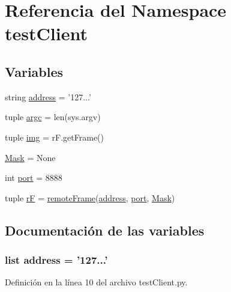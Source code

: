 \hypertarget{namespacetestClient}{\section{Referencia del Namespace test\+Client}
\label{namespacetestClient}
}
\subsection*{Variables}
\begin{DoxyCompactItemize}
\item 
string \hyperlink{namespacetestClient_aa723f31c9553b9750fa5b98615d0a8af}{address} = '127...'
\item 
tuple \hyperlink{namespacetestClient_aad55a8f6b73a60a17d26dfc0d628f89a}{argc} = len(sys.\+argv)
\item 
tuple \hyperlink{namespacetestClient_aec8b285f81ee0dc468a6b86b4345e127}{img} = r\+F.\+get\+Frame()
\item 
\hyperlink{namespacetestClient_a09ad76b7b5cee406ff62ac1cdda80c27}{Mask} = None
\item 
int \hyperlink{namespacetestClient_a1aadf525515ecfcf662c2aa51a503763}{port} = 8888
\item 
tuple \hyperlink{namespacetestClient_a0be24333dfe323a6c01b9f452cc8b142}{r\+F} = \hyperlink{classremoteFrame_1_1remoteFrame}{remote\+Frame}(\hyperlink{namespacetestClient_aa723f31c9553b9750fa5b98615d0a8af}{address}, \hyperlink{namespacetestClient_a1aadf525515ecfcf662c2aa51a503763}{port}, \hyperlink{namespacetestClient_a09ad76b7b5cee406ff62ac1cdda80c27}{Mask})
\end{DoxyCompactItemize}


\subsection{Documentación de las variables}
\hypertarget{namespacetestClient_aa723f31c9553b9750fa5b98615d0a8af}{
\subsubsection[{address}]{\setlength{\rightskip}{0pt plus 5cm}list address = '127...'}}\label{namespacetestClient_aa723f31c9553b9750fa5b98615d0a8af}


Definición en la línea 10 del archivo test\+Client.\+py.

